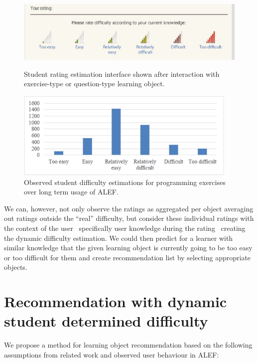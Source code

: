 \documentclass{llncs}
\begin{document}
\begin{figure}
\centering
\includegraphics[width=\textwidth]{images/fig1.png}
\caption{Student rating estimation interface shown after interaction with exercise-type or question-type learning object.}
\label{fig1}
\includegraphics[width=0.95\textwidth]{images/fig2.png}
\caption{Observed student difficulty estimations for programming exercises over long term usage of ALEF.}
\label{fig2}
\end{figure}

We can, however, not only observe the ratings as aggregated per object averaging out ratings outside the ``real'' difficulty, but consider these individual ratings with the context of the user \textendash~specifically user knowledge during the rating \textendash~creating the dynamic difficulty estimation. We could then predict for a learner with similar knowledge that the given learning object is currently going to be too easy or too difficult for them and create recommendation list by selecting appropriate objects.

\section{Recommendation with dynamic student determined difficulty}
\label{sec3}

We propose a method for learning object recommendation based on the following assumptions from related work and observed user behaviour in ALEF:
\end{document}
